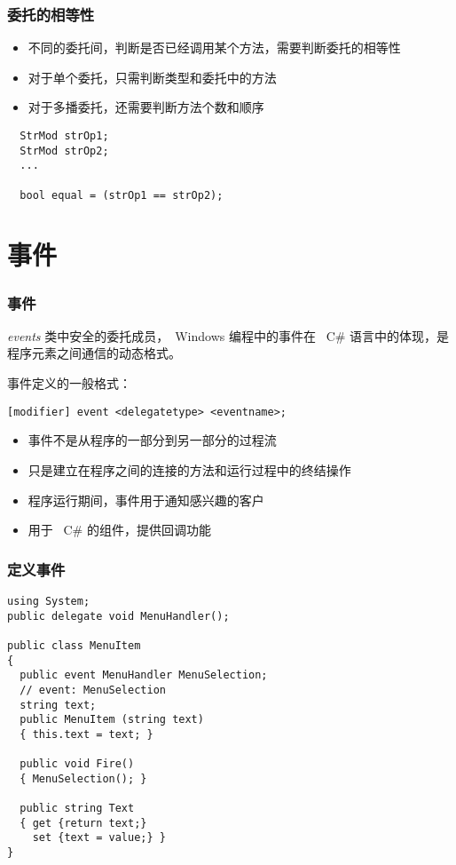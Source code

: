 \begin{frame}[fragile]
\frametitle{委托的相等性}
\begin{itemize}
\item 不同的委托间，判断是否已经调用某个方法，需要判断委托的相等性
\item 对于单个委托，只需判断类型和委托中的方法
\item 对于多播委托，还需要判断方法个数和顺序
\end{itemize}
\begin{lstlisting}
  StrMod strOp1;
  StrMod strOp2;
  ...

  bool equal = (strOp1 == strOp2);

\end{lstlisting}
\end{frame}



\section{事件}

\begin{frame}[fragile]
\frametitle{事件}
\begin{block}{\textit{events}}
  \CJKindent 类中安全的委托成员，~Windows 编程中的事件在 ~C\# 语言中的体现，是
  程序元素之间通信的动态格式。
\end{block}
事件定义的一般格式：
\begin{lstlisting}
[modifier] event <delegatetype> <eventname>;
\end{lstlisting}
\pause
\begin{itemize}
\item 事件不是从程序的一部分到另一部分的过程流
\item 只是建立在程序之间的连接的方法和运行过程中的终结操作
\item 程序运行期间，事件用于通知感兴趣的客户
\item 用于 ~C\# 的组件，提供回调功能
\end{itemize}
\end{frame}

\begin{frame}[fragile]
\frametitle{定义事件}
\begin{lstlisting}
using System;
public delegate void MenuHandler();

public class MenuItem
{
  public event MenuHandler MenuSelection;
  // event: MenuSelection
  string text;
  public MenuItem (string text)
  { this.text = text; }

  public void Fire()
  { MenuSelection(); }

  public string Text
  { get {return text;}
    set {text = value;} }
}
\end{lstlisting}

\end{frame}

